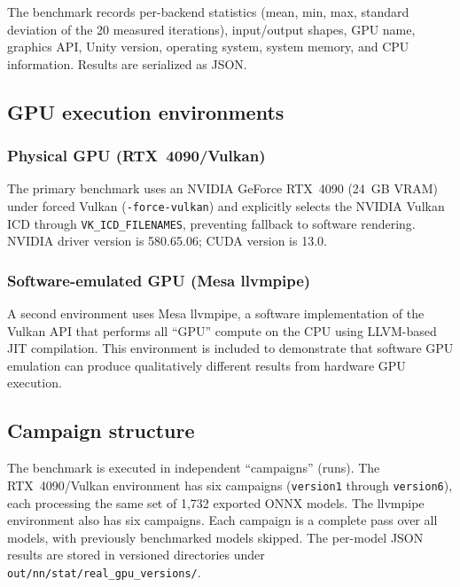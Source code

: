 \documentclass[10pt,twocolumn]{article}
\begin{document}
The benchmark records per-backend statistics (mean, min, max, standard deviation of the 20 measured iterations), input/output shapes, GPU name, graphics API, Unity version, operating system, system memory, and CPU information. Results are serialized as JSON.

\subsection{GPU execution environments}

\subsubsection{Physical GPU (RTX~4090/Vulkan)}

The primary benchmark uses an NVIDIA GeForce RTX~4090 (24~GB VRAM) under forced Vulkan (\texttt{-force-vulkan}) and explicitly selects the NVIDIA Vulkan ICD through \texttt{VK\_ICD\_FILENAMES}, preventing fallback to software rendering. NVIDIA driver version is 580.65.06; CUDA version is 13.0.

\subsubsection{Software-emulated GPU (Mesa llvmpipe)}

A second environment uses Mesa llvmpipe, a software implementation of the Vulkan API that performs all ``GPU'' compute on the CPU using LLVM-based JIT compilation. This environment is included to demonstrate that software GPU emulation can produce qualitatively different results from hardware GPU execution.

\subsection{Campaign structure}

The benchmark is executed in independent ``campaigns'' (runs). The RTX~4090/Vulkan environment has six campaigns (\texttt{version1} through \texttt{version6}), each processing the same set of 1,732 exported ONNX models. The llvmpipe environment also has six campaigns. Each campaign is a complete pass over all models, with previously benchmarked models skipped. The per-model JSON results are stored in versioned directories under \texttt{out/nn/stat/real\_gpu\_versions/}.

\end{document}

